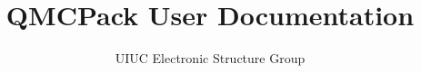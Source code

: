 \documentclass[11pt,letterpaper,fleqn]{report}
\title{QMCPack User Documentation}
\author{UIUC Electronic Structure Group}
\begin{document}
\maketitle
\tableofcontents
\clearpage
\appendix
\clearpage
\nocite{*}
%
%


\end{document}
